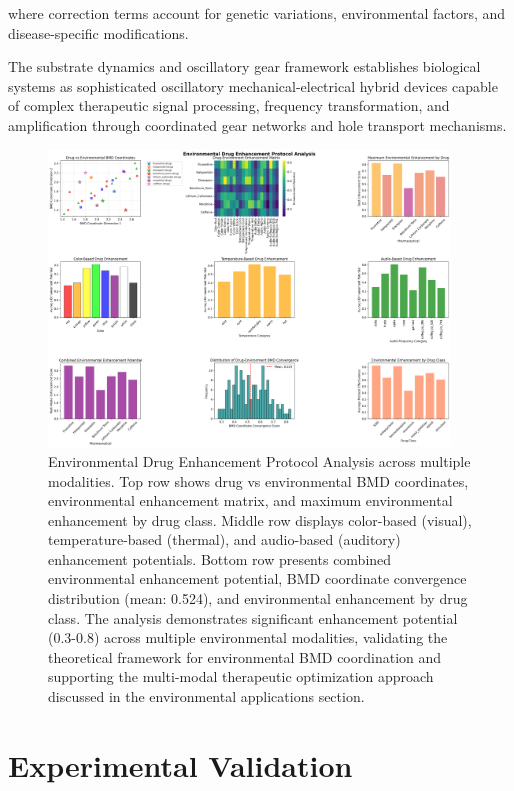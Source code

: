 \documentclass[12pt,a4paper]{article}
\begin{document}
where correction terms account for genetic variations, environmental factors, and disease-specific modifications.

The substrate dynamics and oscillatory gear framework establishes biological systems as sophisticated oscillatory mechanical-electrical hybrid devices capable of complex therapeutic signal processing, frequency transformation, and amplification through coordinated gear networks and hole transport mechanisms.


\begin{figure}[htbp]
    \centering
    \includegraphics[width=0.95\textwidth]{images/environmental_drug_enhancement_20251004_100843.png}
    \caption{Environmental Drug Enhancement Protocol Analysis across multiple modalities. Top row shows drug vs environmental BMD coordinates, environmental enhancement matrix, and maximum environmental enhancement by drug class. Middle row displays color-based (visual), temperature-based (thermal), and audio-based (auditory) enhancement potentials. Bottom row presents combined environmental enhancement potential, BMD coordinate convergence distribution (mean: 0.524), and environmental enhancement by drug class. The analysis demonstrates significant enhancement potential (0.3-0.8) across multiple environmental modalities, validating the theoretical framework for environmental BMD coordination and supporting the multi-modal therapeutic optimization approach discussed in the environmental applications section.}
    \label{fig:environmental_enhancement}
    \end{figure}

\section{Experimental Validation}
\end{document}
